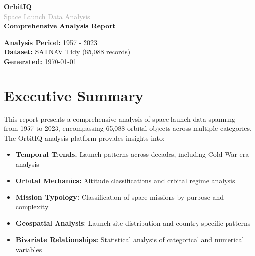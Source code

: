 \documentclass[12pt,a4paper]{article}
\begin{document}
\begin{titlepage}
    \centering
    \vspace*{2cm}
    
    {\Huge\textcolor{accentcolor}{\textbf{OrbitIQ}}}\\[0.5cm]
    {\LARGE\textcolor{darkgray}{Space Launch Data Analysis}}\\[2cm]
    
    {\Large\textbf{Comprehensive Analysis Report}}\\[1cm]
    
    \begin{figure}[H]
        \centering
    \end{figure}
    
    \vfill
    
    {\large
    \textbf{Analysis Period:} 1957 - 2023\\[0.3cm]
    \textbf{Dataset:} SATNAV Tidy (65,088 records)\\[0.3cm]
    \textbf{Generated:} \today
    }
    
    \vspace{1cm}
\end{titlepage}

\tableofcontents
\newpage

\section{Executive Summary}

This report presents a comprehensive analysis of space launch data spanning from 1957 to 2023, encompassing 65,088 orbital objects across multiple categories. The OrbitIQ analysis platform provides insights into:

\begin{itemize}
    \item \textbf{Temporal Trends:} Launch patterns across decades, including Cold War era analysis
    \item \textbf{Orbital Mechanics:} Altitude classifications and orbital regime analysis  
    \item \textbf{Mission Typology:} Classification of space missions by purpose and complexity
    \item \textbf{Geospatial Analysis:} Launch site distribution and country-specific patterns
    \item \textbf{Bivariate Relationships:} Statistical analysis of categorical and numerical variables
\end{itemize}
\end{document}

